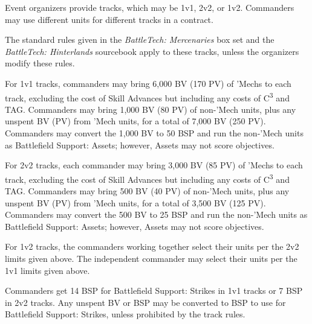 Event organizers provide tracks, which may be 1v1, 2v2, or 1v2.
Commanders may use different units for different tracks in a contract.

The standard rules given in the \emph{BattleTech: Mercenaries} box set and the \emph{BattleTech: Hinterlands} sourcebook apply to these tracks, unless the organizers modify these rules.

For 1v1 tracks, commanders may bring 6,000 BV (170 PV) of 'Mechs to each track, excluding the cost of Skill Advances but including any costs of C\textsuperscript{3} and TAG.
Commanders may bring 1,000 BV (80 PV) of non-'Mech units, plus any unspent BV (PV) from 'Mech units, for a total of 7,000 BV (250 PV).
Commanders may convert the 1,000 BV to 50 BSP and run the non-'Mech units as Battlefield Support: Assets; however, Assets may not score objectives.

For 2v2 tracks, each commander may bring 3,000 BV (85 PV) of 'Mechs to each track, excluding the cost of Skill Advances but including any costs of C\textsuperscript{3} and TAG.
Commanders may bring 500 BV (40 PV) of non-'Mech units, plus any unspent BV (PV) from 'Mech units, for a total of 3,500 BV (125 PV).
Commanders may convert the 500 BV to 25 BSP and run the non-'Mech units as Battlefield Support: Assets; however, Assets may not score objectives.

For 1v2 tracks, the commanders working together select their units per the 2v2 limits given above.
The independent commander may select their units per the 1v1 limits given above.

Commanders get 14 BSP for Battlefield Support: Strikes in 1v1 tracks or 7 BSP in 2v2 tracks.
Any unspent BV or BSP may be converted to BSP to use for Battlefield Support: Strikes, unless prohibited by the track rules.
